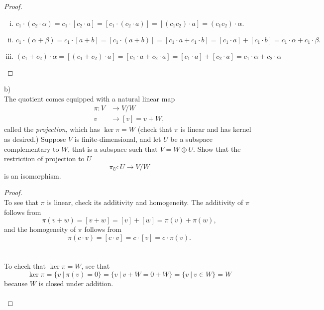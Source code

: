 \documentclass{article}
\newenvironment{problem}[2][Problem]{\begin{trivlist}
\item[\hskip \labelsep {\bfseries #1}\hskip \labelsep {\bfseries #2.}]}{\end{trivlist}}
\begin{document}
\begin{proof}
\begin{enumerate}[(i)]
    \item $
      c_1 \cdot (c_2 \cdot \alpha)
      = c_1 \cdot [c_2\cdot a]
      = [c_1 \cdot (c_2\cdot a)]
      = [(c_1 c_2) \cdot a]
      = (c_1 c_2) \cdot \alpha.
    $
    \item $
      c_1 \cdot (\alpha + \beta)
      = c_1 \cdot [a + b]
      = [c_1 \cdot (a + b)]
      = [c_1 \cdot a + c_1 \cdot b]
      = [c_1 \cdot a] + [c_1 \cdot b]
      = c_1\cdot \alpha + c_1\cdot \beta.
    $
    \item $
      (c_1 + c_2) \cdot \alpha
      = [(c_1 + c_2) \cdot a]
      = [c_1 \cdot a + c_2 \cdot a]
      = [c_1 \cdot a] + [c_2 \cdot a]
      = c_1\cdot \alpha + c_2\cdot \alpha
    $
  \end{enumerate}
\end{proof}

\begin{problem}{1} (b) \\
  The quotient comes equipped with a natural linear map \begin{align*}
    \pi: V &\longrightarrow V/W \\
    v      &\longrightarrow [v] = v + W,
  \end{align*}
  called the \textit{projection}, which has $\ker \pi = W$ (check that $\pi$ is
  linear and has kernel as desired.) Suppose $V$ is finite-dimensional,
  and let $U$ be a subspace complementary to $W$, that is a subspace such that
  $V = W \oplus U$.
  Show that the restriction of projection to $U$ \[
    \pi_U: U \longrightarrow V/W
  \] is an isomorphism.
\end{problem}

\begin{proof} \text{} \\
  To see that $\pi$ is linear, check its additivity and homogeneity.
  The additivity of $\pi$ follows from \[
    \pi(v + w) = [v + w] = [v] + [w] = \pi(v) + \pi(w),
  \]
  and the homogeneity of $\pi$ follows from \[
    \pi(c\cdot v) = [c \cdot v] = c \cdot [v] = c\cdot\pi(v).
  \]\\
  \\
  To check that $\ker \pi = W$, see that \[
    \ker \pi
    = \{ v\ |\ \pi(v) = 0 \}
    = \{ v\ |\ v + W = 0 + W \}
    = \{ v\ |\ v \in W \}
    = W
  \] because $W$ is closed under addition.\\ \\
\end{proof}
\end{document}
